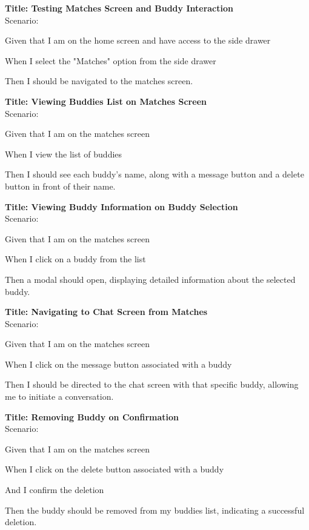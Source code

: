 \bigskip
\textbf{Title: Testing Matches Screen and Buddy Interaction} \\
Scenario:
\begin{compactitem}
    \item Given that I am on the home screen and have access to the side drawer
    \item When I select the "Matches" option from the side drawer
    \item Then I should be navigated to the matches screen.
\end{compactitem}

\bigskip
\textbf{Title: Viewing Buddies List on Matches Screen} \\
Scenario:
\begin{compactitem}
    \item Given that I am on the matches screen
    \item When I view the list of buddies
    \item Then I should see each buddy's name, along with a message button and a delete button in front of their name.
\end{compactitem}

\bigskip
\textbf{Title: Viewing Buddy Information on Buddy Selection} \\
Scenario:
\begin{compactitem}
    \item Given that I am on the matches screen
    \item When I click on a buddy from the list
    \item Then a modal should open, displaying detailed information about the selected buddy.
\end{compactitem}

\bigskip
\textbf{Title: Navigating to Chat Screen from Matches} \\
Scenario:
\begin{compactitem}
    \item Given that I am on the matches screen
    \item When I click on the message button associated with a buddy
    \item Then I should be directed to the chat screen with that specific buddy, allowing me to initiate a conversation.
\end{compactitem}

\bigskip
\textbf{Title: Removing Buddy on Confirmation} \\
Scenario:
\begin{compactitem}
    \item Given that I am on the matches screen
    \item When I click on the delete button associated with a buddy
    \item And I confirm the deletion
    \item Then the buddy should be removed from my buddies list, indicating a successful deletion.
\end{compactitem}

